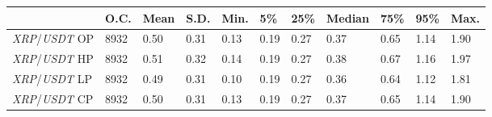 \begin{tabular}{lllllllllll}
\toprule
 & \textbf{O.C.} & \textbf{Mean} & \textbf{S.D.} & \textbf{Min.} & \textbf{5\%} & \textbf{25\%} & \textbf{Median} & \textbf{75\%} & \textbf{95\%} & \textbf{Max.} \\
\midrule
\emph{XRP}/\emph{USDT} OP & 8932 & 0.50 & 0.31 & 0.13 & 0.19 & 0.27 & 0.37 & 0.65 & 1.14 & 1.90 \\
\emph{XRP}/\emph{USDT} HP & 8932 & 0.51 & 0.32 & 0.14 & 0.19 & 0.27 & 0.38 & 0.67 & 1.16 & 1.97 \\
\emph{XRP}/\emph{USDT} LP & 8932 & 0.49 & 0.31 & 0.10 & 0.19 & 0.27 & 0.36 & 0.64 & 1.12 & 1.81 \\
\emph{XRP}/\emph{USDT} CP & 8932 & 0.50 & 0.31 & 0.13 & 0.19 & 0.27 & 0.37 & 0.65 & 1.14 & 1.90 \\
\bottomrule
\end{tabular}
